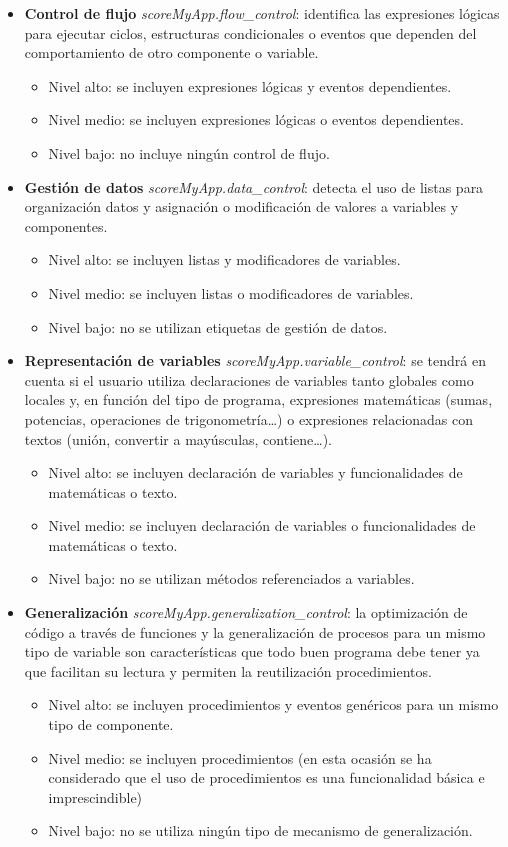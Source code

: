 \documentclass[a4paper, 12pt]{book}
\begin{document}
\begin{itemize}
  \item \textbf{Control de flujo} \textit{scoreMyApp.flow\_control}: identifica las expresiones lógicas para ejecutar ciclos, estructuras condicionales o eventos que dependen del comportamiento de otro componente o variable.
	\begin{itemize}
		\item Nivel alto: se incluyen expresiones lógicas y eventos dependientes. 
		\item Nivel medio: se incluyen expresiones lógicas o eventos dependientes.
		\item Nivel bajo: no incluye ningún control de flujo. 
	\end{itemize}
  \item \textbf{Gestión de datos} \textit{scoreMyApp.data\_control}: detecta el uso de listas para organización datos y asignación o modificación de valores a variables y componentes.
	\begin{itemize}
		\item Nivel alto: se incluyen listas y modificadores de variables. 
		\item Nivel medio: se incluyen listas o modificadores de variables.
		\item Nivel bajo: no se utilizan etiquetas de gestión de datos. 
	\end{itemize}
  \item \textbf{Representación de variables} \textit{scoreMyApp.variable\_control}: se tendrá en cuenta si el usuario utiliza declaraciones de variables tanto globales como locales y, en función del tipo de programa, expresiones matemáticas (sumas, potencias, operaciones de trigonometría\ldots) o expresiones relacionadas con textos (unión, convertir a mayúsculas, contiene\ldots).
	\begin{itemize}
		\item Nivel alto: se incluyen declaración de variables y funcionalidades de matemáticas o texto. 
		\item Nivel medio: se incluyen declaración de variables o funcionalidades de matemáticas o texto.
		\item Nivel bajo: no se utilizan métodos referenciados a variables. 
	\end{itemize}
  \item \textbf{Generalización} \textit{scoreMyApp.generalization\_control}: la optimización de código a través de funciones y la generalización de procesos para un mismo tipo de variable son características que todo buen programa debe tener ya que facilitan su lectura y permiten la reutilización procedimientos.   
	\begin{itemize}
		\item Nivel alto: se incluyen procedimientos y eventos genéricos para un mismo tipo de componente. 
		\item Nivel medio: se incluyen procedimientos (en esta ocasión se ha considerado que el uso de procedimientos es una funcionalidad básica e imprescindible)
		\item Nivel bajo: no se utiliza ningún tipo de mecanismo de generalización. 
	\end{itemize}
\end{itemize}
\end{document}
